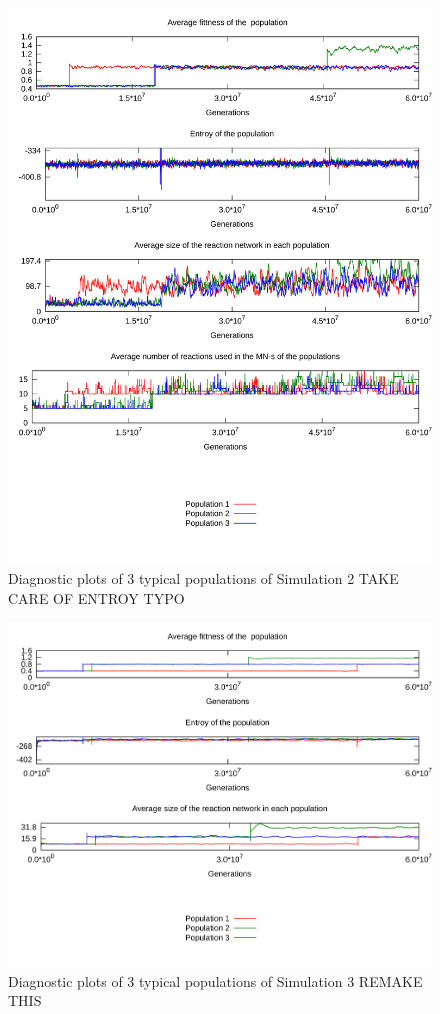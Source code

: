 \documentclass[10pt,a4paper]{article}
\begin{document}
\begin{figure}[htpb]
	\centering
	\includegraphics[width=0.8\linewidth]{simulation2.pdf}
	\caption{Diagnostic plots of 3 typical populations of Simulation 2 TAKE CARE OF ENTROY TYPO}
	\label{fig:simulation2}
\end{figure}

\begin{figure}[htpb]
	\centering
	\includegraphics[width=0.8\linewidth]{simulation3.pdf}
	\caption{Diagnostic plots of 3 typical populations of Simulation 3 REMAKE THIS}
	\label{fig:simulation3}
\end{figure}
\end{document}
